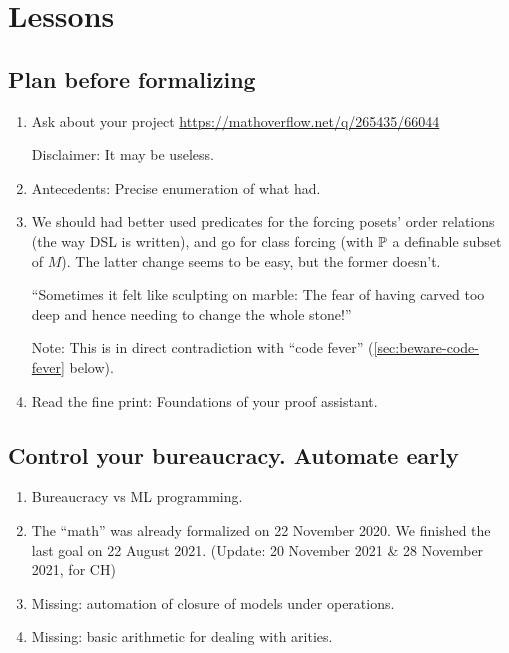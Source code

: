 \section{Lessons}\label{sec:lessons}

\subsection{Plan before formalizing}
\begin{enumerate}
\item Ask about your project
  \url{https://mathoverflow.net/q/265435/66044}

  Disclaimer: It may be useless.
\item Antecedents: Precise enumeration of what  had.

\item We should had better used predicates for the forcing posets'
  order relations (the way DSL is written), and go for class forcing
  (with $\mathbb{P}$ a definable subset of $M$). The latter change seems to be
  easy, but the former doesn't.
  
  “Sometimes it felt like sculpting on marble: The fear of having
  carved too deep and hence needing to change the whole stone!”

  Note: This is in direct contradiction with “code fever”
  (\ref{sec:beware-code-fever} below).
\item Read the fine print: Foundations of your proof assistant.
\end{enumerate}

\subsection{Control your bureaucracy. Automate early}
\begin{enumerate}
\item Bureaucracy vs ML programming.
\item The “math” was already formalized on 22 November 2020.
  We finished the last goal on 22 August 2021.
  (Update: 20 November 2021 \& 28 November 2021, for CH)
\item Missing: automation of closure of models under operations.
\item Missing: basic arithmetic for dealing with arities.
\end{enumerate}

